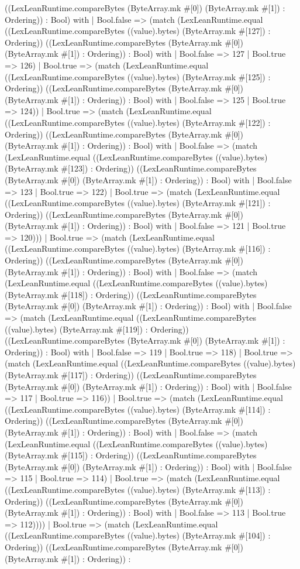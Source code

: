 \documentclass[11pt]{article}
\begin{document}
((LexLeanRuntime.compareBytes (ByteArray.mk \#[0]) (ByteArray.mk \#[1]) : Ordering)) : Bool) with | Bool.false => (match (LexLeanRuntime.equal ((LexLeanRuntime.compareBytes ((value).bytes) (ByteArray.mk \#[127]) : Ordering)) ((LexLeanRuntime.compareBytes (ByteArray.mk \#[0]) (ByteArray.mk \#[1]) : Ordering)) : Bool) with | Bool.false => 127 | Bool.true => 126) | Bool.true => (match (LexLeanRuntime.equal ((LexLeanRuntime.compareBytes ((value).bytes) (ByteArray.mk \#[125]) : Ordering)) ((LexLeanRuntime.compareBytes (ByteArray.mk \#[0]) (ByteArray.mk \#[1]) : Ordering)) : Bool) with | Bool.false => 125 | Bool.true => 124)) | Bool.true => (match (LexLeanRuntime.equal ((LexLeanRuntime.compareBytes ((value).bytes) (ByteArray.mk \#[122]) : Ordering)) ((LexLeanRuntime.compareBytes (ByteArray.mk \#[0]) (ByteArray.mk \#[1]) : Ordering)) : Bool) with | Bool.false => (match (LexLeanRuntime.equal ((LexLeanRuntime.compareBytes ((value).bytes) (ByteArray.mk \#[123]) : Ordering)) ((LexLeanRuntime.compareBytes (ByteArray.mk \#[0]) (ByteArray.mk \#[1]) : Ordering)) : Bool) with | Bool.false => 123 | Bool.true => 122) | Bool.true => (match (LexLeanRuntime.equal ((LexLeanRuntime.compareBytes ((value).bytes) (ByteArray.mk \#[121]) : Ordering)) ((LexLeanRuntime.compareBytes (ByteArray.mk \#[0]) (ByteArray.mk \#[1]) : Ordering)) : Bool) with | Bool.false => 121 | Bool.true => 120))) | Bool.true => (match (LexLeanRuntime.equal ((LexLeanRuntime.compareBytes ((value).bytes) (ByteArray.mk \#[116]) : Ordering)) ((LexLeanRuntime.compareBytes (ByteArray.mk \#[0]) (ByteArray.mk \#[1]) : Ordering)) : Bool) with | Bool.false => (match (LexLeanRuntime.equal ((LexLeanRuntime.compareBytes ((value).bytes) (ByteArray.mk \#[118]) : Ordering)) ((LexLeanRuntime.compareBytes (ByteArray.mk \#[0]) (ByteArray.mk \#[1]) : Ordering)) : Bool) with | Bool.false => (match (LexLeanRuntime.equal ((LexLeanRuntime.compareBytes ((value).bytes) (ByteArray.mk \#[119]) : Ordering)) ((LexLeanRuntime.compareBytes (ByteArray.mk \#[0]) (ByteArray.mk \#[1]) : Ordering)) : Bool) with | Bool.false => 119 | Bool.true => 118) | Bool.true => (match (LexLeanRuntime.equal ((LexLeanRuntime.compareBytes ((value).bytes) (ByteArray.mk \#[117]) : Ordering)) ((LexLeanRuntime.compareBytes (ByteArray.mk \#[0]) (ByteArray.mk \#[1]) : Ordering)) : Bool) with | Bool.false => 117 | Bool.true => 116)) | Bool.true => (match (LexLeanRuntime.equal ((LexLeanRuntime.compareBytes ((value).bytes) (ByteArray.mk \#[114]) : Ordering)) ((LexLeanRuntime.compareBytes (ByteArray.mk \#[0]) (ByteArray.mk \#[1]) : Ordering)) : Bool) with | Bool.false => (match (LexLeanRuntime.equal ((LexLeanRuntime.compareBytes ((value).bytes) (ByteArray.mk \#[115]) : Ordering)) ((LexLeanRuntime.compareBytes (ByteArray.mk \#[0]) (ByteArray.mk \#[1]) : Ordering)) : Bool) with | Bool.false => 115 | Bool.true => 114) | Bool.true => (match (LexLeanRuntime.equal ((LexLeanRuntime.compareBytes ((value).bytes) (ByteArray.mk \#[113]) : Ordering)) ((LexLeanRuntime.compareBytes (ByteArray.mk \#[0]) (ByteArray.mk \#[1]) : Ordering)) : Bool) with | Bool.false => 113 | Bool.true => 112)))) | Bool.true => (match (LexLeanRuntime.equal ((LexLeanRuntime.compareBytes ((value).bytes) (ByteArray.mk \#[104]) : Ordering)) ((LexLeanRuntime.compareBytes (ByteArray.mk \#[0]) (ByteArray.mk \#[1]) : Ordering)) : 
\end{document}
